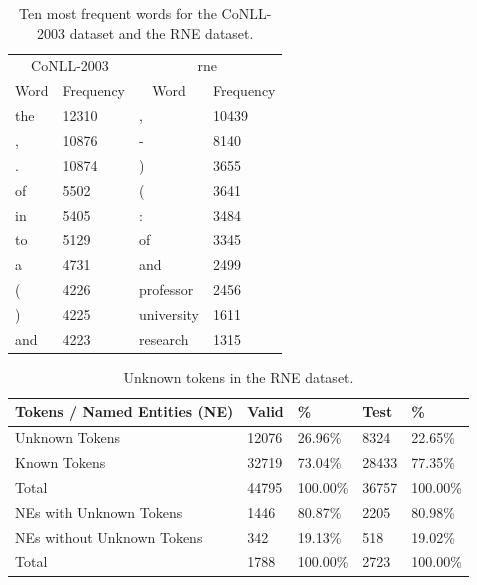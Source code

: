 \documentclass{nle}
\begin{document}
\begin{table}[h]
  \small
  \begin{center}
    \begin{tabular}{ llll }
      \toprule
      \multicolumn{2}{c}{CoNLL-2003} & \multicolumn{2}{c}{\gls{rne}} \\
      \multicolumn{1}{c}{Word} & \multicolumn{1}{c}{Frequency} &
      \multicolumn{1}{c}{Word} & \multicolumn{1}{c}{Frequency} \\
      \midrule
      the & 12310 & , & 10439      \\
      , & 10876 & - & 8140         \\
      . & 10874 & ) & 3655         \\
      of & 5502 & ( & 3641         \\
      in & 5405 & : & 3484         \\
      to & 5129 & of & 3345        \\
      a & 4731 & and & 2499        \\
      ( & 4226 & professor & 2456  \\
      ) & 4225 & university & 1611 \\
      and & 4223 & research & 1315 \\
      \bottomrule
    \end{tabular}
  \end{center}
  \caption{Ten most frequent words for the {CoNLL-2003} dataset and the RNE dataset.}
  \label{tab:frequent_words}
\end{table}

\begin{table}[h]
  \small
  \begin{center}
    \begin{tabular}{ lllll }
      \toprule
      Tokens / Named Entities (NE) & Valid & \% & Test & \%\\
      \midrule
      Unknown Tokens & 12076 & 26.96\% & 8324  & 22.65\% \\
      Known Tokens   & 32719 & 73.04\% & 28433 & 77.35\% \\
      Total          & 44795 & 100.00\%   & 36757 & 100.00\%   \\
      \midrule
      NEs with Unknown Tokens    & 1446 & 80.87\% & 2205 & 80.98\% \\
      NEs without Unknown Tokens & 342  & 19.13\% & 518  & 19.02\% \\
      Total                      & 1788 & 100.00\% & 2723 & 100.00\%   \\
      \bottomrule
    \end{tabular}
  \end{center}
  \caption{Unknown tokens in the RNE dataset.}
  \label{tab:unknown_tokens}
\end{table}
\end{document}
